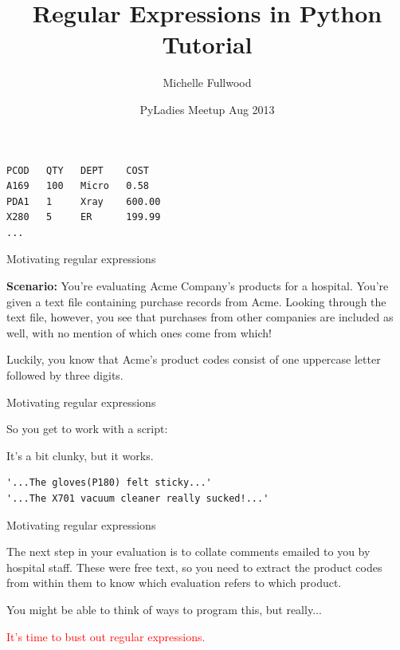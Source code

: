 \documentclass{beamer}
\title[Regexes in Python]{Regular Expressions in Python Tutorial}
\author{Michelle Fullwood}
\date{PyLadies Meetup Aug 2013}
\begin{document}
\begin{frame}
\titlepage
\end{frame}


\begin{lrbox}{\mysavebox}
\begin{lstlisting}
PCOD   QTY   DEPT    COST
A169   100   Micro   0.58
PDA1   1     Xray    600.00
X280   5     ER      199.99
...
\end{lstlisting}
\end{lrbox}

\begin{frame}{Motivating regular expressions}

{\bf Scenario:} You're evaluating Acme Company's products for a hospital.
You're given a text file containing purchase records from Acme.
Looking through the text file, however, you see that purchases from other companies
are included as well, with no mention of which ones come from which!

\vspace{1.5em}
{\usebox{\mysavebox}}
\vspace{1em}

Luckily, you know that Acme's product codes consist of one
uppercase letter followed by three digits.

\end{frame}


\begin{frame}{Motivating regular expressions}

So you get to work with a script:



It's a bit clunky, but it works.

\end{frame}

\begin{lrbox}{\mysavebox}
\begin{lstlisting}
'...The gloves(P180) felt sticky...'
'...The X701 vacuum cleaner really sucked!...'
\end{lstlisting}
\end{lrbox}

\begin{frame}{Motivating regular expressions}

The next step in your evaluation is to collate comments
emailed to you by hospital staff. These were free text,
so you need to extract the product codes from within them
to know which evaluation refers to which product.

\vspace{1.5em}
{\usebox{\mysavebox}}
\vspace{1em}

You might be able to think of ways to program this,
but really...

\begin{center}
\textcolor{red}{It's time to bust out regular expressions.}
\end{center}

\end{frame}
\end{document}
